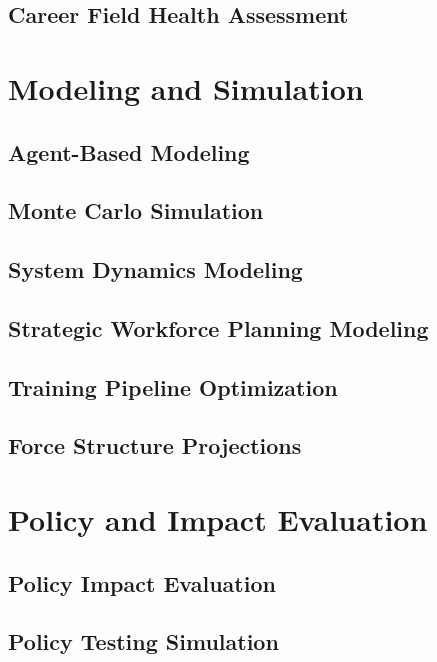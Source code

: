 \documentclass[12pt,a4paper]{article}
\begin{document}
\subsection{Career Field Health Assessment}


\newpage
\section{Modeling and Simulation}

\subsection{Agent-Based Modeling}


\subsection{Monte Carlo Simulation}


\subsection{System Dynamics Modeling}


\subsection{Strategic Workforce Planning Modeling}


\subsection{Training Pipeline Optimization}


\subsection{Force Structure Projections}


\newpage
\section{Policy and Impact Evaluation}

\subsection{Policy Impact Evaluation}


\subsection{Policy Testing Simulation}

\end{document}
